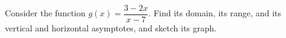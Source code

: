 Consider the function $g(x)=\dfrac{3-2x}{x-7}$. Find its domain, its range, and its vertical and horizontal asymptotes, and sketch its graph.
